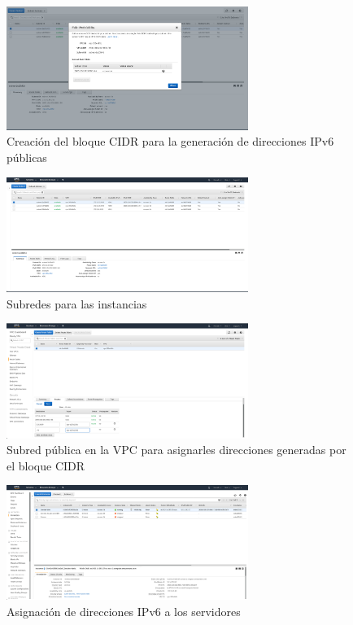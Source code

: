 \documentclass[9pt]{article}
\begin{document}
\begin{figure}[H]
  \centering
  \includegraphics[width=0.7\textwidth]{ipv6_cidr}
  \caption{Creación del bloque CIDR para la generación de direcciones IPv6 públicas}
\end{figure}

\begin{figure}[H]
  \centering
  \includegraphics[width=0.7\textwidth]{subnets}
  \caption{Subredes para las instancias}
\end{figure}

\begin{figure}[H]
  \centering
  \includegraphics[width=0.7\textwidth]{public_subnet}
  \caption{Subred pública en la VPC para asignarles direcciones generadas por el bloque CIDR}
\end{figure}

\begin{figure}[H]
  \centering
  \includegraphics[width=0.7\textwidth]{ipv6_assignment}
  \caption{Asignación de direcciones IPv6 a los servidores}
\end{figure}
\end{document}
